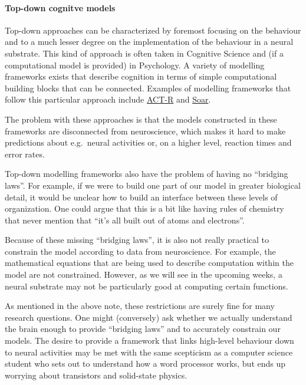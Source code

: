 \documentclass[10pt,letterpaper,oneside]{article}
\begin{document}
\paragraph{Top-down cognitve models}
Top-down approaches can be characterized by foremost focusing on the behaviour and to a much lesser degree on the implementation of the behaviour in a neural substrate. This kind of approach is often taken in Cognitive Science and (if a computational model is provided) in Psychology. A variety of modelling frameworks exists that describe cognition in terms of simple computational building blocks that can be connected. Examples of modelling frameworks that follow this particular approach include \href{http://act-r.psy.cmu.edu/}{ACT-R} and \href{https://soar.eecs.umich.edu/}{Soar}.

The problem with these approaches is that the models constructed in these frameworks are disconnected from neuroscience, which makes it hard to make predictions about e.g.~neural activities or, on a higher level, reaction times and error rates.

Top-down modelling frameworks also have the problem of having no \enquote{bridging laws}. For example, if we were to build one part of our model in greater biological detail, it would be unclear how to build an interface between these levels of organization. One could argue that this is a bit like having rules of chemistry that never mention that \enquote{it's all built out of atoms and electrons}.

Because of these missing \enquote{bridging laws}, it is also not really practical to constrain the model according to data from neuroscience. For example, the mathematical equations that are being used to describe computation within the model are not constrained. However, as we will see in the upcoming weeks, a neural substrate may not be particularly good at computing certain functions.

As mentioned in the above note, these restrictions are surely fine for many research questions. One might (conversely) ask whether we actually understand the brain enough to provide \enquote{bridging laws} and to accurately constrain our models. The desire to provide a framework that links high-level behaviour down to neural activities may be met with the same scepticism as a computer science student who sets out to understand how a word processor works, but ends up worrying about transistors and solid-state physics.

\end{document}
